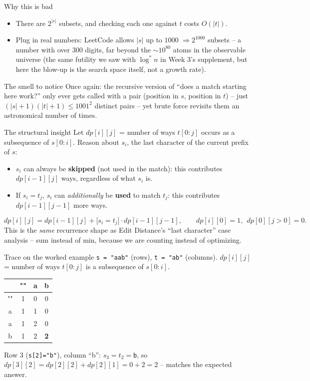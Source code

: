 \documentclass[11pt,aspectratio=169]{beamer}
\begin{document}
\begin{frame}{Why this is bad}
  \begin{itemize}
    \item There are $2^{|s|}$ subsets, and checking each one against $t$ costs $O(|t|)$.
    \item Plug in real numbers: LeetCode allows $|s|$ up to $1000$
    $\Rightarrow 2^{1000}$ subsets -- a number with over 300 digits, far beyond the
    $\sim\!10^{80}$ atoms in the observable universe (the same futility we saw with
    $\log^* n$ in Week 3's supplement, but here the blow-up is the search space itself,
    not a growth rate).
  \end{itemize}
  \begin{alertblock}{The smell to notice}
    Once again: the recursive version of ``does a match starting here work?'' only ever
    gets called with a pair (position in $s$, position in $t$) -- just
    $(|s|{+}1)(|t|{+}1) \le 1001^2$ distinct pairs -- yet brute force revisits them an
    astronomical number of times.
  \end{alertblock}
\end{frame}

\begin{frame}{The structural insight}
  Let $dp[i][j]$ = number of ways $t[0{:}j]$ occurs as a subsequence of $s[0{:}i]$.
  Reason about $s_i$, the last character of the current prefix of $s$:
  \begin{itemize}
    \item $s_i$ can always be \textbf{skipped} (not used in the match): this
    contributes $dp[i-1][j]$ ways, regardless of what $s_i$ is.
    \item If $s_i = t_j$, $s_i$ can \emph{additionally} be \textbf{used} to match
    $t_j$: this contributes $dp[i-1][j-1]$ more ways.
  \end{itemize}
  \[
    dp[i][j] = dp[i-1][j] + \big[s_i = t_j\big]\cdot dp[i-1][j-1], \qquad
    dp[i][0] = 1,\ \ dp[0][j>0] = 0.
  \]
  This is the \emph{same} recurrence shape as Edit Distance's ``last character'' case
  analysis -- sum instead of min, because we are counting instead of optimizing.
\end{frame}

\begin{frame}{Trace on the worked example}
  \small
  \texttt{s = "aab"} (rows), \texttt{t = "ab"} (columns). $dp[i][j]$ = number of ways
  $t[0{:}j]$ is a subsequence of $s[0{:}i]$.
  \begin{center}
  \begin{tabular}{@{}c|ccc@{}}
     & "" & a & b \\
    \midrule
    "" & 1 & 0 & 0 \\
    a & 1 & 1 & 0 \\
    a & 1 & 2 & 0 \\
    b & 1 & 2 & \textbf{2} \\
  \end{tabular}
  \end{center}
  Row 3 (\texttt{s[2]="b"}), column ``b'': $s_3=t_2=$\texttt{b}, so
  $dp[3][2] = dp[2][2] + dp[2][1] = 0 + 2 = 2$ -- matches the expected answer.
\end{frame}
\end{document}
